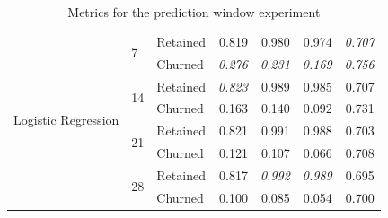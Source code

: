 \documentclass{kththesis}
\begin{document}
\begin{table}[h]
\begin{tabular}{lllrrrr}
\cline{1-7}
\cline{2-7}
\multirow{8}{*}{Logistic Regression} & \multirow{2}{*}{7} & Retained &  0.819 &  0.980 &   0.974 &  \textit{0.707} \\
     &   & Churned &  \textit{0.276} &  \textit{0.231} &   \textit{0.169} &  \textit{0.756} \\
\cline{2-7}
     & \multirow{2}{*}{14} & Retained &  \textit{0.823} &  0.989 &   0.985 &  0.707 \\
     &   & Churned &  0.163 &  0.140 &   0.092 &  0.731 \\
\cline{2-7}
     & \multirow{2}{*}{21} & Retained &  0.821 &  0.991 &   0.988 &  0.703 \\
     &   & Churned &  0.121 &  0.107 &   0.066 &  0.708 \\
\cline{2-7}
     & \multirow{2}{*}{28} & Retained &  0.817 &  \textit{0.992} &  \textit{0.989} &  0.695 \\
     &   & Churned &  0.100 &  0.085 &   0.054 &  0.700 \\
\bottomrule
\end{tabular}
\caption{Metrics for the prediction window experiment}
\label{tab:pred_window}
\end{table}

\end{document}
